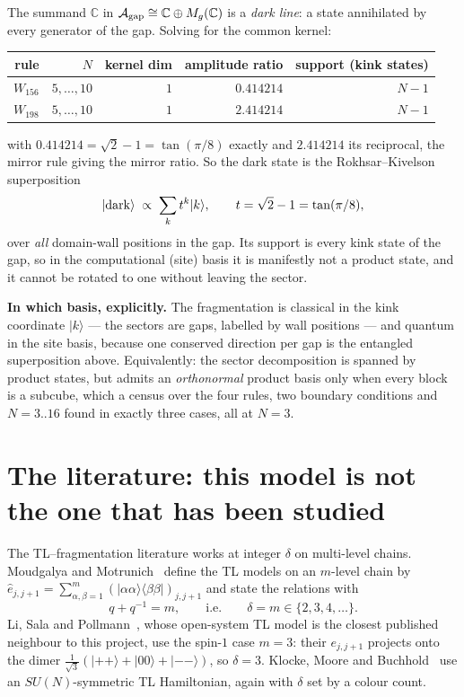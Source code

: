 \documentclass[11pt]{article}
\newcommand{\A}{\mathcal{A}}
\theoremstyle{plain}
\theoremstyle{remark}
\begin{document}
The summand $\mathbb{C}$ in $\A_{\rm gap} \cong \mathbb{C}\oplus M_g(\mathbb{C})$
is a \emph{dark line}: a state annihilated by every generator of the gap. Solving
for the common kernel:

\begin{center}
\begin{tabular}{rrrrr}
\toprule
rule & $N$ & kernel dim & amplitude ratio & support (kink states) \\
\midrule
$W_{156}$ & $5,\dots,10$ & $1$ & $0.414214$ & $N-1$ \\
$W_{198}$ & $5,\dots,10$ & $1$ & $2.414214$ & $N-1$ \\
\bottomrule
\end{tabular}
\end{center}

\noindent with $0.414214 = \sqrt2 - 1 = \tan(\pi/8)$ exactly and $2.414214$ its
reciprocal, the mirror rule giving the mirror ratio. So the dark state is the
Rokhsar--Kivelson superposition
\begin{equation}
  |{\rm dark}\rangle \;\propto\; \sum_k t^k |k\rangle,
  \qquad t = \sqrt2 - 1 = \tan(\pi/8),
\end{equation}
over \emph{all} domain-wall positions in the gap. Its support is every kink state
of the gap, so in the computational (site) basis it is manifestly not a product
state, and it cannot be rotated to one without leaving the sector.

\textbf{In which basis, explicitly.} The fragmentation is classical in the kink
coordinate $|k\rangle$ --- the sectors are gaps, labelled by wall positions ---
and quantum in the site basis, because one conserved direction per gap is the
entangled superposition above. Equivalently: the sector decomposition is spanned
by product states, but admits an \emph{orthonormal} product basis only when every
block is a subcube, which a census over the four rules, two boundary conditions
and $N = 3..16$ found in exactly three cases, all at $N = 3$.

\section{The literature: this model is not the one that has been studied}
\label{sec:lit}

The TL--fragmentation literature works at integer $\delta$ on multi-level chains.
Moudgalya and Motrunich~\cite{MM2022} define the TL models on an $m$-level chain
by $\hat e_{j,j+1} = \sum_{\alpha,\beta=1}^{m} (|\alpha\alpha\rangle\langle\beta\beta|)_{j,j+1}$
and state the relations with
\[
  q + q^{-1} = m, \qquad\text{i.e.}\qquad \delta = m \in \{2,3,4,\dots\}.
\]
Li, Sala and Pollmann~\cite{Li2023}, whose open-system TL model is the closest
published neighbour to this project, use the spin-$1$ case $m = 3$: their
$e_{j,j+1}$ projects onto the dimer
$\tfrac{1}{\sqrt3}(|{+}{+}\rangle + |00\rangle + |{-}{-}\rangle)$, so
$\delta = 3$. Klocke, Moore and Buchhold~\cite{Klocke2024} use an
$SU(N)$-symmetric TL Hamiltonian, again with $\delta$ set by a colour count.
\end{document}
